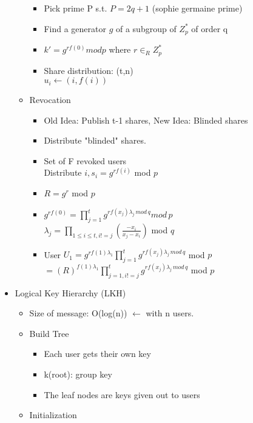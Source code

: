 \begin{itemize}
\begin{itemize}
        \begin{itemize}
        \item Pick prime P s.t. $P = 2q + 1$ (sophie germaine prime)
        \item Find a generator $g$ of a subgroup of $Z_p^*$ of order q
        \item $k' = g^{rf(0)} mod p$ where $r \in_R Z_p^*$
        \item Share distribution: (t,n)
            \\ $u_i \leftarrow (i, f(i))$
        \end{itemize}
    \item Revocation
        \begin{itemize}
        \item Old Idea: Publish t-1 shares, New Idea: Blinded shares
        \item Distribute "blinded" shares. 
        \item Set of F revoked users
            \\Distribute $i,s_i = g^{rf(i)}$ mod $p$
        \item $R = g^r$ mod $p$
        \item $g^{rf(0)} = \prod_{j=1}^t g^{rf(x_j)\lambda_j\,mod\, q} mod\,p$
            \\$\lambda_j = \prod_{1 \le i \le t, i!=j}(\frac{-x_i}{x_j-x_i})$ mod $q$
        \item User $U_1 = g^{rf(1)\lambda_1} \prod_{j=1}^t g^{rf(x_j)\lambda_j\,mod\,q}$ mod $p$
            \\ $= (R)^{f(1)\lambda_1} \prod_{j=1, i!=j}^t g^{rf(x_j)\lambda_j\,mod\,q}$ mod $p$
        \end{itemize}
    \end{itemize}
\item Logical Key Hierarchy (LKH)
    \begin{itemize}
    \item Size of message: O(log(n)) $\leftarrow$ with n users.
    \item Build Tree
        \begin{itemize}
        \item Each user gets their own key
        \item k(root): group key
        \item The leaf nodes are keys given out to users
        \end{itemize}
    \item Initialization
        \begin{itemize}

\end{itemize}
\end{itemize}
\end{itemize}

